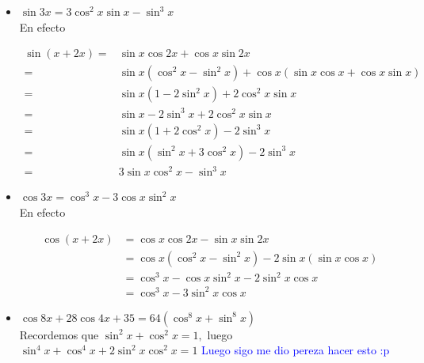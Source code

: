 \documentclass[11pt]{article}
\begin{document}
\begin{itemize}
  \item $\sin 3 x=3 \cos ^{2} x \sin x-\sin ^{3} x$\\

En efecto

$$
\begin{aligned}
\sin (x+2 x)= & \sin x \cos 2 x+\cos x \sin 2 x \\
= & \sin x\left(\cos ^2 x-\sin ^2 x\right)+\cos x(\sin x \cos x+\cos x \sin x) \\
= & \sin x\left(1-2 \sin ^2 x\right)+2 \cos ^2 x \sin x \\
= & \sin x-2 \sin ^3 x+2 \cos ^2 x \sin x \\
= & \sin x\left(1+2 \cos ^2 x\right)-2 \sin ^3 x \\
= & \sin x\left(\sin ^2 x+3 \cos ^2 x\right)-2 \sin ^3 x \\
= & 3 \sin x \cos ^2 x-\sin ^3 x
\end{aligned}
$$

  \item $\cos 3 x=\cos ^{3} x-3 \cos x \sin ^{2} x$\\

  En efecto

  $$
\begin{aligned}
\cos (x+2 x) & =\cos x \cos 2 x-\sin x \sin 2 x \\
& =\cos x\left(\cos ^2 x-\sin ^2 x\right)-2 \sin x(\sin x \cos x) \\
& =\cos ^3 x-\cos x \sin ^2 x-2 \sin ^2 x \cos x \\
& =\cos ^3 x-3 \sin ^2 x \cos x
\end{aligned}
$$
  \item $\cos 8 x+28 \cos 4 x+35=64\left(\cos ^{8} x+\sin ^{8} x\right)$\\

  Recordemos que $\sin^2x+\cos^2x=1,$ luego $\sin^4x+\cos^4x+2\sin^2x\cos^2x=1$ \textcolor{blue}{Luego sigo me dio pereza hacer esto :p}

\end{itemize}
\end{document}
